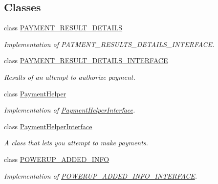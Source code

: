 \subsection*{Classes}
\begin{DoxyCompactItemize}
\item 
class \hyperlink{classAsteroids_1_1Domain_1_1Store_1_1PAYMENT__RESULT__DETAILS}{P\+A\+Y\+M\+E\+N\+T\+\_\+\+R\+E\+S\+U\+L\+T\+\_\+\+D\+E\+T\+A\+I\+LS}
\begin{DoxyCompactList}\small\item\em Implementation of P\+A\+T\+M\+E\+N\+T\+\_\+\+R\+E\+S\+U\+L\+T\+S\+\_\+\+D\+E\+T\+A\+I\+L\+S\+\_\+\+I\+N\+T\+E\+R\+F\+A\+CE. \end{DoxyCompactList}\item 
class \hyperlink{classAsteroids_1_1Domain_1_1Store_1_1PAYMENT__RESULT__DETAILS__INTERFACE}{P\+A\+Y\+M\+E\+N\+T\+\_\+\+R\+E\+S\+U\+L\+T\+\_\+\+D\+E\+T\+A\+I\+L\+S\+\_\+\+I\+N\+T\+E\+R\+F\+A\+CE}
\begin{DoxyCompactList}\small\item\em Results of an attempt to authorize payment. \end{DoxyCompactList}\item 
class \hyperlink{classAsteroids_1_1Domain_1_1Store_1_1PaymentHelper}{Payment\+Helper}
\begin{DoxyCompactList}\small\item\em Implementation of \hyperlink{classAsteroids_1_1Domain_1_1Store_1_1PaymentHelperInterface}{Payment\+Helper\+Interface}. \end{DoxyCompactList}\item 
class \hyperlink{classAsteroids_1_1Domain_1_1Store_1_1PaymentHelperInterface}{Payment\+Helper\+Interface}
\begin{DoxyCompactList}\small\item\em A class that lets you attempt to make payments. \end{DoxyCompactList}\item 
class \hyperlink{classAsteroids_1_1Domain_1_1Store_1_1POWERUP__ADDED__INFO}{P\+O\+W\+E\+R\+U\+P\+\_\+\+A\+D\+D\+E\+D\+\_\+\+I\+N\+FO}
\begin{DoxyCompactList}\small\item\em Implementation of \hyperlink{classAsteroids_1_1Domain_1_1Store_1_1POWERUP__ADDED__INFO__INTERFACE}{P\+O\+W\+E\+R\+U\+P\+\_\+\+A\+D\+D\+E\+D\+\_\+\+I\+N\+F\+O\+\_\+\+I\+N\+T\+E\+R\+F\+A\+CE}. \end{DoxyCompactList}\item 

\end{DoxyCompactItemize}
